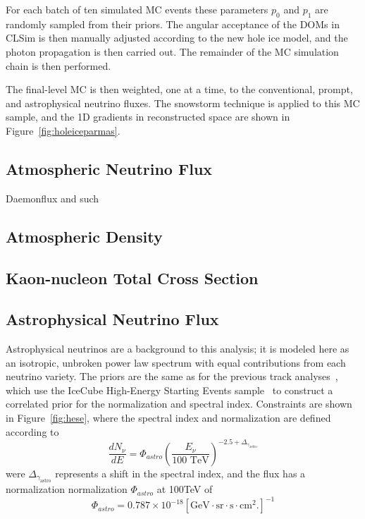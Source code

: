 \documentclass[main.tex]{subfiles}
\begin{document}
For each batch of ten simulated MC events these parameters $p_{0}$ and $p_{1}$ are randomly sampled from their priors. 
The angular acceptance of the DOMs in CLSim is then manually adjusted according to the new hole ice model, and the photon propagation is then carried out. 
The remainder of the MC simulation chain is then performed.

The final-level MC is then weighted, one at a time, to the conventional, prompt, and astrophysical neutrino fluxes. 
The snowstorm technique is applied to this MC sample, and the 1D gradients in reconstructed space are shown in Figure~\ref{fig:holeiceparmas}. 

\subsection{Atmospheric Neutrino Flux}
Daemonflux and such

\subsection{Atmospheric Density}

\subsection{Kaon-nucleon Total Cross Section}

\subsection{Astrophysical Neutrino Flux}

Astrophysical neutrinos are a background to this analysis; it is modeled here as an isotropic, unbroken power law spectrum with equal contributions from each neutrino variety.
The priors are the same as for the previous track analyses~\cite{Aartsen_2020, Aartsen_2020_prd}, which use the IceCube High-Energy Starting Events sample~\cite{2021hese} to construct a correlated prior for the normalization and spectral index. 
Constraints are shown in Figure~\ref{fig:hese}, where the spectral index and normalization are defined according to 
\begin{equation}
    \dfrac{d N_{\nu}}{dE}  = \Phi_{astro}\left(\dfrac{E_{\nu}}{100\text{ TeV}}\right)^{-2.5 + \Delta_{\gamma_{\text{astro}}} }
\end{equation}
were $\Delta_{\gamma_{\text{astro}}}$ represents a shift in the spectral index, and the flux has a normalization normalization $\Phi_{astro}$ at 100TeV of 
\begin{equation}
\Phi_{astro} = 0.787\times 10^{-18} \left[\text{GeV}\cdot\text{sr}\cdot\text{s}\cdot\text{cm}^{2}.\right]^{-1}
\end{equation}
\end{document}
